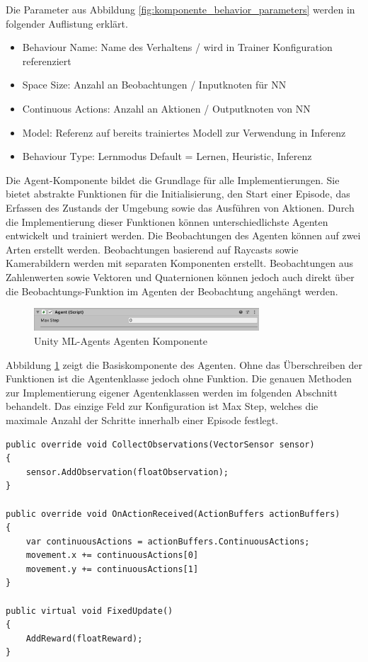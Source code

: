 Die Parameter aus Abbildung \ref{fig:komponente_behavior_parameters} werden in folgender Auflistung erklärt.

\begin{itemize}
  \item Behaviour Name: Name des Verhaltens / wird in Trainer Konfiguration referenziert
  \item Space Size: Anzahl an Beobachtungen / Inputknoten für NN
  \item Continuous Actions: Anzahl an Aktionen / Outputknoten von NN
  \item Model: Referenz auf bereits trainiertes Modell zur Verwendung in Inferenz
  \item Behaviour Type: Lernmodus Default = Lernen, Heuristic, Inferenz
\end{itemize}

Die Agent-Komponente bildet die Grundlage für alle Implementierungen. Sie bietet abstrakte Funktionen für die Initialisierung, den Start einer Episode, das Erfassen des Zustands der Umgebung sowie das Ausführen von Aktionen. Durch die Implementierung dieser Funktionen können unterschiedlichste Agenten entwickelt und trainiert werden. Die Beobachtungen des Agenten können auf zwei Arten erstellt werden. Beobachtungen basierend auf Raycasts sowie Kamerabildern werden mit separaten Komponenten erstellt. Beobachtungen aus Zahlenwerten sowie Vektoren und Quaternionen können jedoch auch direkt über die Beobachtungs-Funktion im Agenten der Beobachtung angehängt werden.

\begin{figure}[H]
  \centering
  \includegraphics[width=0.75\textwidth]{img/komponente_agent}
  \caption{Unity ML-Agents Agenten Komponente}
  \label{fig:komponente_agent}
\end{figure}

Abbildung \ref{fig:komponente_agent} zeigt die Basiskomponente des Agenten. Ohne das Überschreiben der Funktionen ist die Agentenklasse jedoch ohne Funktion. Die genauen Methoden zur Implementierung eigener Agentenklassen werden im folgenden Abschnitt behandelt. Das einzige Feld zur Konfiguration ist \grqq{}Max Step\grqq{}, welches die maximale Anzahl der Schritte innerhalb einer Episode festlegt.

\begin{lstlisting}[caption={Agent Funktionen},captionpos=b,label={lst:agent_funktionen}]
public override void CollectObservations(VectorSensor sensor)
{
    sensor.AddObservation(floatObservation);
}

public override void OnActionReceived(ActionBuffers actionBuffers)
{
    var continuousActions = actionBuffers.ContinuousActions;
    movement.x += continuousActions[0]
    movement.y += continuousActions[1]
}

public virtual void FixedUpdate()
{
    AddReward(floatReward);
}
\end{lstlisting}

